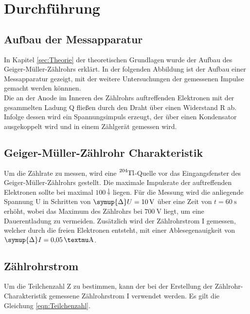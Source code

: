 \section{Durchführung} \label{sec:Durchführung}

\subsection{Aufbau der Messapparatur}


    In Kapitel \ref{sec:Theorie} der theoretischen Grundlagen wurde der Aufbau des Geiger-Müller-Zählrohrs erklärt.
    In der folgenden Abbildung ist der Aufbau einer Messapparatur gezeigt, 
    mit der weitere Untersuchungen der gemessenen Impulse gemacht werden könnnen. \\
    Die an der Anode im Inneren des Zählrohrs auftreffenden Elektronen mit der gesammelten 
    Ladung Q fließen durch den Draht über einen Widerstand R ab. 
    Infolge dessen wird ein Spannungsimpuls erzeugt, 
    der über einen Kondensator ausgekoppelt wird und in einem Zählgerät gemessen wird.

\subsection{Geiger-Müller-Zählrohr Charakteristik} \label{sec:charaktbestimmen}

    Um die Zählrate zu messen, wird eine $\ce{^204Tl}$-Quelle vor das Eingangsfenster
    des Geiger-Müller-Zählrohrs gestellt. Die maximale Impulsrate der auftreffenden 
    Elektronen sollte bei maximal $\SI{100}{\frac{1}{\second}}$ liegen. 
    Für die Messung wird die anliegende Spannung U in Schritten von $\symup{\Delta}U = \SI{10}{\volt}$ 
    über eine Zeit von $t = \SI{60}{\second}$ erhöht, 
    wobei das Maximum des Zählrohrs bei $\SI{700}{\volt}$ liegt, um eine Dauerentladung
    zu vermeiden.
    Zusätzlich wird der Zählrohrstrom I gemessen, welcher durch die freien Elektronen 
    entsteht, mit einer Ablesegenauigkeit von $\symup{\Delta}I = \SI{0.05}{\textmu\ampere}$.

 \subsection{Zählrohrstrom}

    Um die Teilchenzahl Z zu bestimmen, kann der bei der Erstellung der Zählrohr-Charakteristik
    gemessene Zählrohrstrom I verwendet werden. Es gilt die Gleichung \eqref{eqn:Teilchenzahl}.

